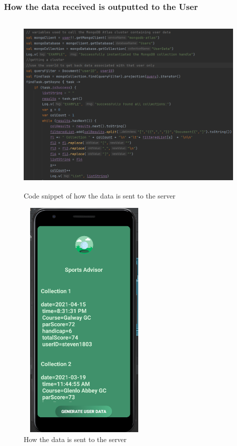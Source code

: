 \subsubsection{How the data received is outputted to the User}
\begin{figure}[H]
    \centering
    \includegraphics[width=15cm, height = 9cm]{img/getMongoDBdata.PNG}
    \caption{Code snippet of how the data is sent to the server}
    \label{fig:altas config}
\end{figure}

\begin{figure}[H]
    \centering
    \includegraphics[width=6.5cm, height =12cm]{img/userHistoryPage.PNG}
    \caption{How the data is sent to the server}
    \label{fig:altas config}
\end{figure}

